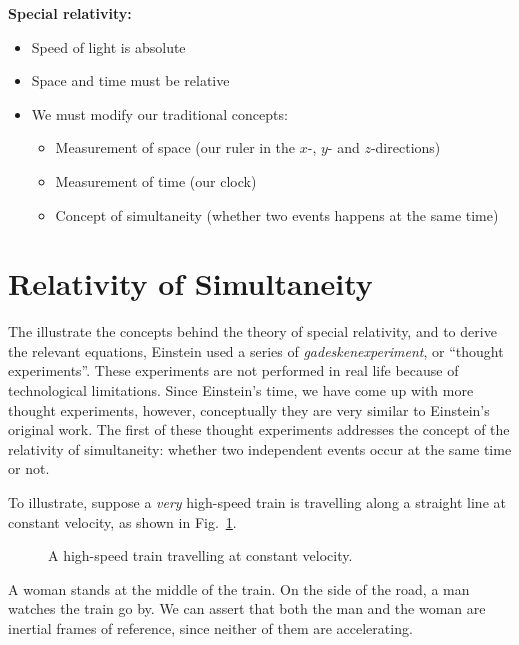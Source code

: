 \textbf{Special relativity:}
\begin{itemize}
\item Speed of light is absolute
\item Space and time must be relative
\item We must modify our traditional concepts:
  \begin{itemize}
  \item Measurement of space (our ruler in the $x$-, $y$- and $z$-directions)
  \item Measurement of time (our clock)
  \item Concept of simultaneity (whether two events happens at the same time)
  \end{itemize}
\end{itemize}
%
%
%
%
%
%
\section{Relativity of Simultaneity}%

The illustrate the concepts behind the theory of special relativity, and to
derive the relevant equations, Einstein used a series of
\emph{gadeskenexperiment}, or ``thought experiments''. These experiments are
not performed in real life because of technological limitations. Since
Einstein's time, we have come up with more thought experiments, however,
conceptually they are very similar to Einstein's original work. The first of
these thought experiments addresses the concept of the relativity of
simultaneity: whether two independent events occur at the same time or not.

To illustrate, suppose a \emph{very} high-speed train is travelling along a
straight line at constant velocity, as shown in Fig.~\ref{fig:highspeed-train}.
\begin{figure}[ht]
  \centering
  \caption{A high-speed train travelling at constant velocity.}
  \label{fig:highspeed-train}
\end{figure}
A woman stands at the middle of the train. On the side of the road, a man
watches the train go by. We can assert that both the man and the woman are
inertial frames of reference, since neither of them are accelerating.

